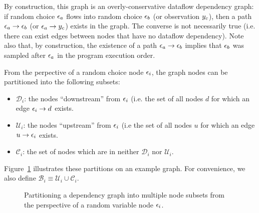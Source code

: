 By construction, this graph is an overly-conservative dataflow dependency graph: if random choice $\epsilon_a$ flows into random choice $\epsilon_b$ (or observation $y_c$), then a path $\epsilon_a \to \epsilon_b$ (or $\epsilon_a \to y_c$) exists in the graph. The converse is not necessarily true (i.e. there can exist edges between nodes that have no dataflow dependency). Note also that, by construction, the existence of a path $\epsilon_a \to \epsilon_b$ implies that $\epsilon_b$ was sampled after $\epsilon_a$ in the program execution order.

From the perpective of a random choice node $\epsilon_i$, the graph nodes can be partitioned into the following subsets:
\begin{itemize}
\item{$\mathcal{D}_i$: the nodes ``downstream'' from $\epsilon_i$ (i.e. the set of all nodes $d$ for which an edge $\epsilon_i \to d$ exists.}
\item{$\mathcal{U}_i$: the nodes ``upstream'' from $\epsilon_i$ (i.e the set of all nodes $u$ for which an edge $u \to \epsilon_i$ exists.}
\item{$\mathcal{C}_i$: the set of nodes which are in neither $\mathcal{D}_i$ nor $\mathcal{U}_i$.}
\end{itemize}
Figure~\ref{fig:graphPartitions} illustrates these partitions on an example graph. For convenience, we also define $\mathcal{B}_i \equiv \mathcal{U}_i \cup \mathcal{C}_i$.

\begin{figure}[!ht]
\centering

\caption{Partitioning a dependency graph into multiple node subsets from the perspective of a random variable node $\epsilon_i$.}
\label{fig:graphPartitions}
\end{figure}

